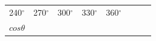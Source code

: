 \begin{center}
\begin{xtabular*}{\mytablewidth}[t]{|p{10\mystarwidth}|p{10\mystarwidth}|p{10\mystarwidth}|p{10\mystarwidth}|p{10\mystarwidth}|p{10\mystarwidth}|p{10\mystarwidth}|p{10\mystarwidth}|}
        240${}^{\circ }$ &
        270${}^{\circ }$ &
        300${}^{\circ }$ &
        330${}^{\circ }$ &
        360${}^{\circ }$%
     \tabularnewline{}
                  $cos\theta $
                 &
         &
         &
         &
         &
         &
         &

\end{xtabular*}
\end{center}
